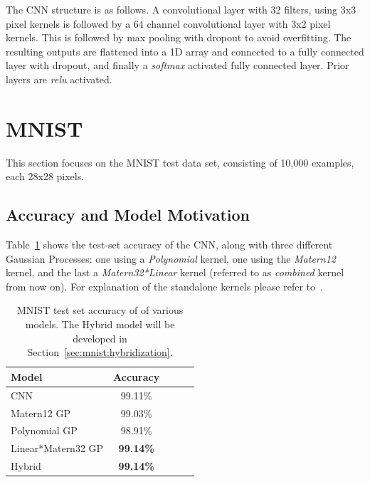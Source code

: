 \documentclass{article}
\begin{document}
The CNN structure is as follows. A convolutional layer with 32 filters, using 3x3 pixel kernels is followed by a 64 channel convolutional layer with 3x2 pixel kernels. This is followed by max pooling with dropout to avoid overfitting. The resulting outputs are flattened into a 1D array and connected to a fully connected layer with dropout, and finally a \textit{softmax} activated fully connected layer. Prior layers are \textit{relu} activated.








\section{MNIST}
\label{sec:mnist}
This section focuses on the MNIST test data set, consisting of 10,000 examples, each 28x28 pixels.

\subsection{Accuracy and Model Motivation}
\label{sec:mnist:acc}

Table~\ref{tab:model_accuracies} shows the test-set accuracy of the CNN, along with three different Gaussian Processes: one using a \textit{Polynomial} kernel, one using the \textit{Matern12} kernel, and the last a \textit{Matern32*Linear} kernel (referred to as \textit{combined} kernel from now on). For explanation of the standalone kernels please refer to~\citet{rasmussen2006gaussian}.


\begin{table}[htb]
\caption{MNIST test set accuracy of of various models. The Hybrid model will be developed in Section~\ref{sec:mnist:hybridization}.}
\vskip 0.15in
\begin{center}
\begin{small}
\begin{sc}
\begin{tabular}{lcccr}
\toprule
Model 				& Accuracy \\
\midrule
CNN    				& 99.11\%  \\
Matern12 GP	 		& 99.03\%  \\
Polynomial GP    	& 98.91\%  \\
Linear*Matern32 GP	& \textbf{99.14\%}  \\
Hybrid    			& \textbf{99.14\%}  \\
\bottomrule
\end{tabular}
\end{sc}
\end{small}
\end{center}
\vskip -0.1in
\label{tab:model_accuracies}
\end{table}
\end{document}
